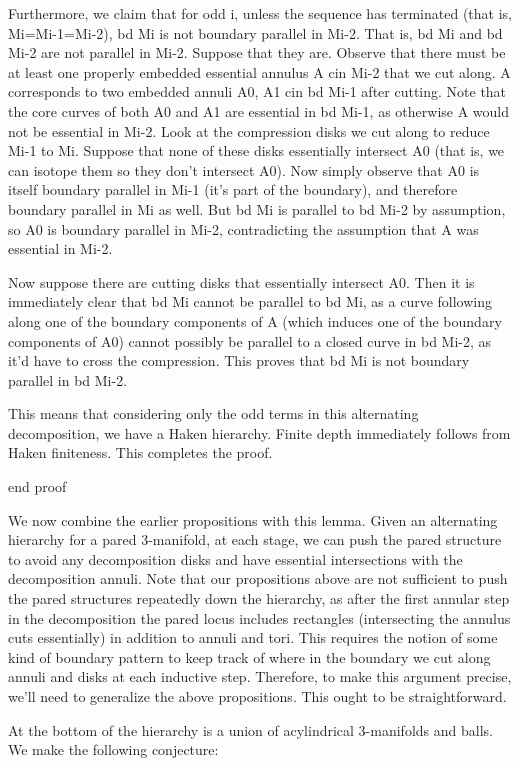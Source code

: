 Furthermore, we claim that for odd i, unless the sequence has terminated (that
is, Mi=Mi-1=Mi-2), bd Mi is not boundary parallel in Mi-2. That is, bd Mi and
bd Mi-2 are not parallel in Mi-2. Suppose that they are. Observe that there
must be at least one properly embedded essential annulus A cin Mi-2 that we cut
along. A corresponds to two embedded annuli A0, A1 cin bd Mi-1 after cutting.
Note that the core curves of both A0 and A1 are essential in bd Mi-1, as
otherwise A would not be essential in Mi-2. Look at the compression disks we
cut along to reduce Mi-1 to Mi. Suppose that none of these disks essentially
intersect A0 (that is, we can isotope them so they don't intersect A0). Now
simply observe that A0 is itself boundary parallel in Mi-1 (it's part of the
boundary), and therefore boundary parallel in Mi as well. But bd Mi is parallel
to bd Mi-2 by assumption, so A0 is boundary parallel in Mi-2, contradicting the
assumption that A was essential in Mi-2.

Now suppose there are cutting disks that essentially intersect A0. Then it is
immediately clear that bd Mi cannot be parallel to bd Mi, as a curve following
along one of the boundary components of A (which induces one of the boundary
components of A0) cannot possibly be parallel to a closed curve in bd Mi-2, as
it'd have to cross the compression. This proves that bd Mi is not boundary
parallel in bd Mi-2.

This means that considering only the odd terms in this alternating
decomposition, we have a Haken hierarchy. Finite depth immediately follows from
Haken finiteness. This completes the proof.

end proof

We now combine the earlier propositions with this lemma. Given an alternating
hierarchy for a pared 3-manifold, at each stage, we can push the pared
structure to avoid any decomposition disks and have essential intersections
with the decomposition annuli. Note that our propositions above are not
sufficient to push the pared structures repeatedly down the hierarchy, as after
the first annular step in the decomposition the pared locus includes rectangles
(intersecting the annulus cuts essentially) in addition to annuli and tori.
This requires the notion of some kind of boundary pattern to keep track of
where in the boundary we cut along annuli and disks at each inductive step.
Therefore, to make this argument precise, we'll need to generalize the above
propositions. This ought to be straightforward.

At the bottom of the hierarchy is a union of acylindrical 3-manifolds and
balls. We make the following conjecture:


